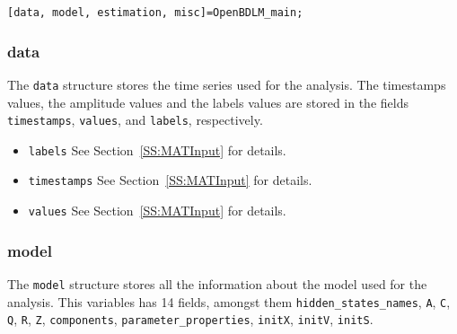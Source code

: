  \raggedright{\colorbox{light-gray}{\lstinline[basicstyle = \mlttfamily \small]![data, model, estimation, misc]=OpenBDLM_main;!}} \\

\subsubsection{data} 

The \lstinline[basicstyle = \mlttfamily \small]!data! structure stores the time series used for the analysis. The timestamps values, the amplitude values and the labels values are stored in the fields \lstinline[basicstyle = \mlttfamily \small ]!timestamps!, \lstinline[basicstyle = \mlttfamily \small ]!values!, and \lstinline[basicstyle = \mlttfamily \small ]!labels!, respectively.
\begin{itemize}
\item \lstinline[basicstyle = \mlttfamily \small ]!labels!  See Section~\ref{SS:MATInput} for details.
\item \lstinline[basicstyle = \mlttfamily \small ]!timestamps!  See Section~\ref{SS:MATInput} for details.
\item \lstinline[basicstyle = \mlttfamily \small ]!values!  See Section~\ref{SS:MATInput} for details.
\end{itemize}

\subsubsection{model}
The \lstinline[basicstyle = \mlttfamily \small]!model! structure stores all the information about the model used for the analysis. This variables has 14 fields, amongst them \lstinline[basicstyle = \mlttfamily \small ]!hidden_states_names!, \lstinline[basicstyle = \mlttfamily \small ]!A!, \lstinline[basicstyle = \mlttfamily \small ]!C!, \lstinline[basicstyle = \mlttfamily \small ]!Q!, \lstinline[basicstyle = \mlttfamily \small ]!R!, \lstinline[basicstyle = \mlttfamily \small ]!Z!, \lstinline[basicstyle = \mlttfamily \small ]!components!, \lstinline[basicstyle = \mlttfamily \small ]!parameter_properties!, \lstinline[basicstyle = \mlttfamily \small ]!initX!, \lstinline[basicstyle = \mlttfamily \small ]!initV!, \lstinline[basicstyle = \mlttfamily \small ]!initS!.


